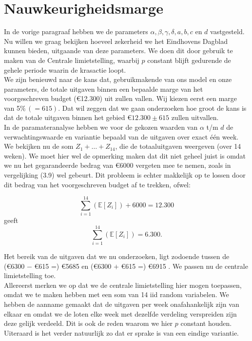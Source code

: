 \section{Nauwkeurigheidsmarge}

In de vorige paragraaf hebben we de parameters $\alpha, \beta, \gamma, \delta, a,b,c$ en $d$ vastgesteld. Nu willen we graag bekijken hoeveel zekerheid we het Eindhovens Dagblad kunnen bieden, uitgaande van deze parameters. We doen dit door gebruik te maken van de Centrale limietstelling, waarbij $p$ constant blijft gedurende de gehele periode waarin de krasactie loopt.\\

We zijn benieuwd naar de kans dat, gebruikmakende van ons model en onze parameters, de totale uitgaven binnen een bepaalde marge van het voorgeschreven budget (\euro12.300) uit zullen vallen. Wij kiezen eerst een marge van 5$\% \,(=615)$. Dat wil zeggen dat we gaan onderzoeken hoe groot de kans is dat de totale uitgaven binnen het gebied \euro$12.300 \pm 615$ zullen uitvallen.\\

In de paramateranalyse hebben we voor de gekozen waarden van $\alpha$ t/m $d$ de verwachtingswaarde en variantie bepaald van de uitgaven over exact één week. We bekijken nu de som $Z_{1} + \ldots + Z_{14}$, die de totaaluitgaven weergeven (over 14 weken). We moet hier wel de opmerking maken dat dit niet geheel juist is omdat we nu het gegarandeerde bedrag van \euro6000 vergeten mee te nemen, zoals in vergelijking (3.9) wel gebeurt. Dit probleem is echter makkelijk op te lossen door dit bedrag van het voorgeschreven budget af te trekken, ofwel:

\begin{equation*}
\sum_{i=1}^{14} \left( \mathbb{E}[Z_{i}] \right) + 6000 = 12.300
\end{equation*}
geeft
\begin{equation*}
\sum_{i=1}^{14} \left( \mathbb{E}[Z_{i}] \right) = 6.300.
\end{equation*}

Het bereik van de uitgaven dat we nu onderzoeken, ligt zodoende tussen de (\euro6300 $-$ \euro615 =) \euro5685 en (\euro6300 $+$ \euro615 =) \euro6915 . We passen nu de centrale limietstelling toe.\\

Allereerst merken we op dat we de centrale limietstelling hier mogen toepassen, omdat we te maken hebben met een som van 14 iid random variabelen. We hebben de aanname gemaakt dat de uitgaven per week onafahankelijk zijn van elkaar en omdat we de loten elke week met dezelfde verdeling verspreiden zijn deze gelijk verdeeld. Dit is ook de reden waarom we hier $p$ constant houden. Uiteraard is het verder natuurlijk zo dat er sprake is van een eindige variantie.\\

